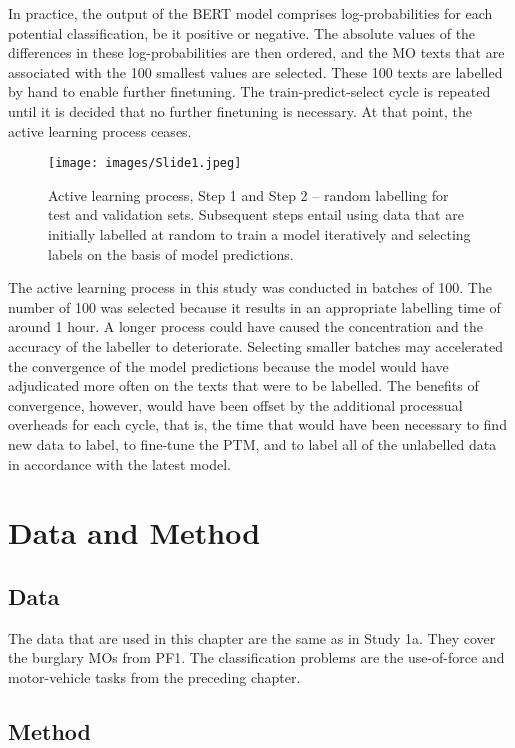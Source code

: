 In practice, the output of the BERT model comprises log-probabilities for each potential classification, be it positive or negative. The absolute values of the differences in these log-probabilities are then ordered, and the MO texts that are associated with the 100 smallest values are selected. These 100 texts are labelled by hand to enable further finetuning. The train-predict-select cycle is repeated until it is decided that no further finetuning is necessary. At that point, the active learning process ceases.

\begin{figure}[!tbp]
  \centering
    \texttt{[image: images/Slide1.jpeg]}
    \caption[Active Learning Process.]{Active learning process, Step 1 and Step 2 – random labelling for test and validation sets. Subsequent steps entail using data that are initially labelled at random to train a model iteratively and selecting labels on the basis of model predictions.}
    \label{fig:active_process}
\end{figure}

 The active learning process in this study was conducted in batches of 100. The number of 100 was selected because it results in an appropriate labelling time of around 1 hour. A longer process could have caused the concentration and the accuracy of the labeller to deteriorate. Selecting smaller batches may accelerated the convergence of the model predictions because the model would have adjudicated more often on the texts that were to be labelled. The benefits of convergence, however, would have been offset by the additional processual overheads for each cycle, that is, the time that would have been necessary to find new data to label, to fine-tune the PTM, and to label all of the unlabelled data in accordance with the latest model.
\section{Data and Method}


\subsection{Data}

The data that are used in this chapter are the same as in Study 1a. They cover the burglary MOs from PF1. The classification problems are the use-of-force and motor-vehicle tasks from the preceding chapter.

\subsection{Method}

